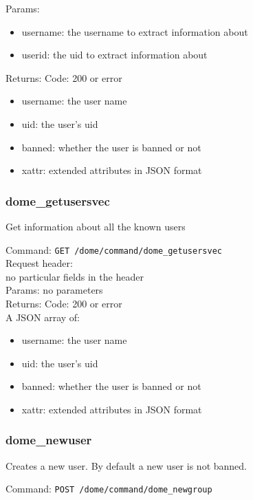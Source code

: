 \documentclass[a4paper,10pt]{scrreprt}
\begin{document}
Params:
\begin{itemize}
 \item username: the username to extract information about
 \item userid: the uid to extract information about
\end{itemize}

Returns:
Code: 200 or error
\begin{itemize}
 \item username: the user name
 \item uid: the user's uid
 \item banned: whether the user is banned or not
 \item xattr: extended attributes in JSON format
\end{itemize}


\subsubsection{dome\_getusersvec}

Get information about all the known users

Command:
\lstinline"GET /dome/command/dome_getusersvec"\\

Request header:\\
no particular fields in the header\\

Params:
no parameters\\

Returns:
Code: 200 or error\\
A JSON array of:
\begin{itemize}
 \item username: the user name
 \item uid: the user's uid
 \item banned: whether the user is banned or not
 \item xattr: extended attributes in JSON format
\end{itemize}


\subsubsection{dome\_newuser}

Creates a new user. By default a new user is not banned.

Command:
\lstinline"POST /dome/command/dome_newgroup"\\
\end{document}
